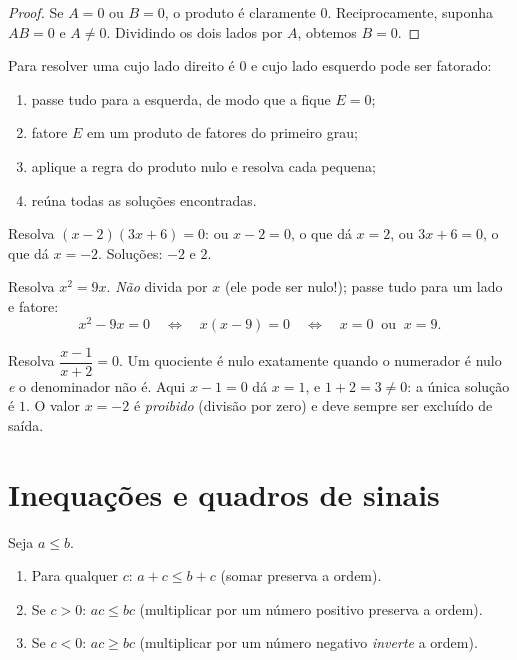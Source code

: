 \begin{proof}
Se $A = 0$ ou $B = 0$, o produto é claramente $0$. Reciprocamente,
suponha $AB = 0$ e $A \neq 0$. Dividindo os dois lados por $A$, obtemos
$B = 0$.
\end{proof}

\begin{method}\label{met:g10:algebra:zeroproduct}
Para resolver uma  cujo lado direito é $0$ e cujo lado esquerdo
pode ser fatorado:
\begin{enumerate}
  \item passe tudo para a esquerda, de modo que a  fique $E = 0$;
  \item fatore $E$ em um produto de fatores do primeiro grau;
  \item aplique a regra do produto nulo e resolva cada  pequena;
  \item reúna todas as soluções encontradas.
\end{enumerate}
\end{method}

\begin{example}\label{ex:g10:algebra:zeroproduct}
Resolva $(x - 2)(3x + 6) = 0$: ou $x - 2 = 0$, o que dá $x = 2$, ou
$3x + 6 = 0$, o que dá $x = -2$. Soluções: $-2$ e $2$.

Resolva $x^2 = 9x$. \emph{Não} divida por $x$ (ele pode ser nulo!); passe
tudo para um lado e fatore:
\[
x^2 - 9x = 0
\quad\Longleftrightarrow\quad
x(x - 9) = 0
\quad\Longleftrightarrow\quad
x = 0 \ \text{ ou } \ x = 9 .
\]
\end{example}

\begin{example}\label{ex:g10:algebra:quotient}
Resolva $\dfrac{x - 1}{x + 2} = 0$. Um quociente é nulo exatamente quando
o numerador é nulo \emph{e} o denominador não é. Aqui $x - 1 = 0$ dá
$x = 1$, e $1 + 2 = 3 \neq 0$: a única solução é $1$. O valor $x = -2$ é
\emph{proibido} (divisão por zero) e deve sempre ser excluído de saída.
\end{example}

\section{Inequações e quadros de sinais}

\begin{proposition}\label{prop:g10:algebra:ineqrules}
Seja $a \leq b$.
\begin{enumerate}
  \item Para qualquer $c$: $a + c \leq b + c$ (somar preserva a ordem).
  \item Se $c > 0$: $ac \leq bc$ (multiplicar por um número positivo
        preserva a ordem).
  \item Se $c < 0$: $ac \geq bc$ (multiplicar por um número negativo
        \emph{inverte} a ordem).
\end{enumerate}
\end{proposition}

